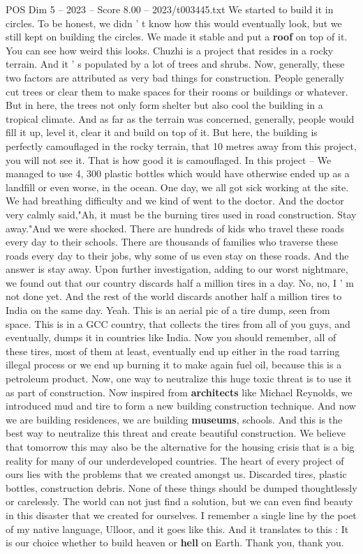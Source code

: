 \begin{textsample}{POS Dim 5 – 2023 – Score 8.00 – 2023/t003445.txt}
We started to build it in circles.
To be honest, we didn ' t know how this would eventually look, but we still kept on building the circles.
We made it stable and put a \textbf{roof} on top of it.
You can see how weird this looks.
Chuzhi is a project that resides in a rocky terrain.
And it ' s populated by a lot of trees and shrubs.
Now, generally, these two factors are attributed as very bad things for construction.
People generally cut trees or clear them to make spaces for their rooms or buildings or whatever.
But in here, the trees not only form shelter but also cool the building in a tropical climate.
And as far as the terrain was concerned, generally, people would fill it up, level it, clear it and build on top of it.
But here, the building is perfectly camouflaged in the rocky terrain, that 10 metres away from this project, you will not see it.
That is how good it is camouflaged.
In this project -- We managed to use 4, 300 plastic bottles which would have otherwise ended up as a landfill or even worse, in the ocean.
One day, we all got sick working at the site.
We had breathing difficulty and we kind of went to the doctor.
And the doctor very calmly said,"Ah, it must be the burning tires used in road construction.
Stay away."And we were shocked.
There are hundreds of kids who travel these roads every day to their schools.
There are thousands of families who traverse these roads every day to their jobs, why some of us even stay on these roads.
And the answer is stay away.
Upon further investigation, adding to our worst nightmare, we found out that our country discards half a million tires in a day.
No, no, I ' m not done yet.
And the rest of the world discards another half a million tires to India on the same day.
Yeah.
This is an aerial pic of a tire dump, seen from space.
This is in a GCC country, that collects the tires from all of you guys, and eventually, dumps it in countries like India.
Now you should remember, all of these tires, most of them at least, eventually end up either in the road tarring illegal process or we end up burning it to make again fuel oil, because this is a petroleum product.
Now, one way to neutralize this huge toxic threat is to use it as part of construction.
Now inspired from \textbf{architects} like Michael Reynolds, we introduced mud and tire to form a new building construction technique.
And now we are building residences, we are building \textbf{museums}, schools.
And this is the best way to neutralize this threat and create beautiful construction.
We believe that tomorrow this may also be the alternative for the housing crisis that is a big reality for many of our underdeveloped countries.
The heart of every project of ours lies with the problems that we created amongst us.
Discarded tires, plastic bottles, construction debris.
None of these things should be dumped thoughtlessly or carelessly.
The world can not just find a solution, but we can even find beauty in this disaster that we created for ourselves.
I remember a single line by the poet of my native language, Ulloor, and it goes like this.
And it translates to this : It is our choice whether to build heaven or \textbf{hell} on Earth.
Thank you, thank you.

\end{textsample}
